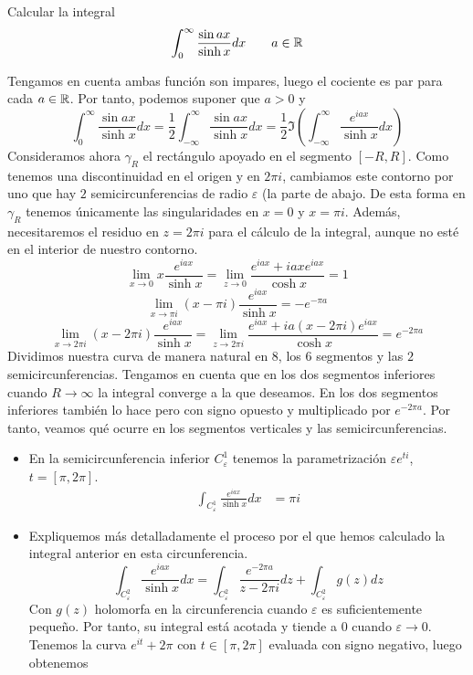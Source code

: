 \documentclass[twoside]{article}
\begin{document}
\begin{ejercicio}{4}
Calcular la integral
$$
\int_0^\infty \frac{\sin ax}{\sinh x}dx \qquad a \in \mathbb{R}
$$
\end{ejercicio}
\begin{solucion}
Tengamos en cuenta ambas función son impares, luego el cociente es par para cada $a\in \mathbb{R}$. Por tanto, podemos suponer que $a>0$ y
$$
\int_0^\infty \frac{\sin ax}{\sinh x}dx 
 = \frac{1}{2} \int_{-\infty}^\infty \frac{\sin ax}{\sinh x}dx = \frac{1}{2}\Im\left( \int_{-\infty}^\infty \frac{e^{iax}}{\sinh x}dx\right)
$$
Consideramos ahora $\gamma_R$ el rectángulo apoyado en el segmento $[-R,R]$. Como tenemos una discontinuidad en el origen y en $2\pi i$, cambiamos este contorno por uno que hay $2$ semicircunferencias de radio $\varepsilon$ (la parte de abajo. De esta forma en $\gamma_R$ tenemos únicamente las singularidades en $x=0$ y $x=\pi i$. Además, necesitaremos el residuo en $z=2\pi i$ para el cálculo de la integral, aunque no esté en el interior de nuestro contorno.
$$
\lim_{x\to0}x\frac{e^{iax}}{\sinh x} = \lim_{z\to0}\frac{e^{iax}+iaxe^{iax}}{\cosh x} = 1
$$
$$
\lim_{x\to \pi i}(x-\pi i)\frac{e^{iax}}{\sinh x} = -e^{ -\pi a}
$$
$$
\lim_{x\to 2\pi i}(x-2\pi i)\frac{e^{iax}}{\sinh x} = \lim_{z\to 2\pi i}\frac{e^{iax}+ia(x-2\pi i)e^{iax}}{\cosh x} = e^{-2\pi a}
$$
Dividimos nuestra curva de manera natural en $8$, los $6$ segmentos y las $2$ semicircunferencias. Tengamos en cuenta que en los dos segmentos inferiores cuando $R\to \infty$ la integral converge a la que deseamos. En los dos segmentos inferiores también lo hace pero con signo opuesto y multiplicado por $e^{-2\pi a}$. Por tanto, veamos qué ocurre en los segmentos verticales y las semicircunferencias.
\begin{itemize}
\item En la semicircunferencia inferior $C^1_\varepsilon$ tenemos la parametrización $\varepsilon e^{ti}$, $t=[\pi,2\pi]$.
\begin{align*}
\int_{C^1_\varepsilon} \frac{e^{iax}}{\sinh x}dx &=   \pi i
\end{align*}
\item Expliquemos más detalladamente el proceso por el que hemos calculado la integral anterior en esta circunferencia.
$$
\int_{C^2_\varepsilon} \frac{e^{iax}}{\sinh x}dx =  \int_{C^2_\varepsilon} \frac{e^{-2\pi a}}{z-2\pi i} dz + \int_{C^2_\varepsilon} g(z)dz
$$
Con $g(z)$ holomorfa en la circunferencia cuando $\varepsilon$ es suficientemente pequeño. Por tanto, su integral está acotada y tiende a $0$ cuando $\varepsilon \to 0$. Tenemos la curva $e^{it}+2\pi$ con $t\in [\pi,2\pi]$ evaluada con signo negativo, luego obtenemos

\end{itemize}
\end{solucion}
\end{document}
